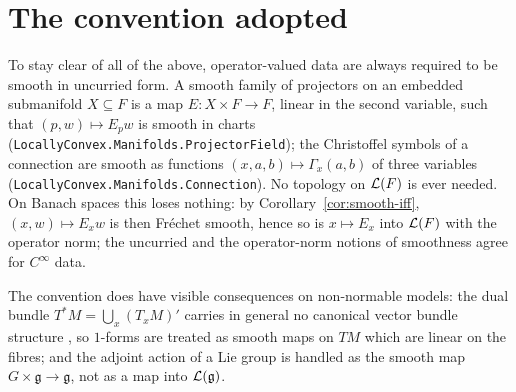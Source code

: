 \section{The convention adopted}

To stay clear of all of the above, operator-valued data are always required to be smooth in
uncurried form. A smooth family of projectors on an embedded submanifold $X \subseteq F$ is a
map $E \colon X \times F \to F$, linear in the second variable, such that $(p, w) \mapsto
E_p w$ is smooth in charts (\texttt{LocallyConvex.Manifolds.ProjectorField}); the Christoffel symbols of a
connection are smooth as functions $(x, a, b) \mapsto \Gamma_x(a, b)$ of three variables
(\texttt{LocallyConvex.Manifolds.Connection}). No topology on $\mathcal{L}(F)$ is ever needed. On Banach spaces
this loses nothing: by Corollary~\ref{cor:smooth-iff}, $(x, w) \mapsto E_x w$ is then Fréchet
smooth, hence so is $x \mapsto E_x$ into $\mathcal{L}(F)$ with the operator norm; the uncurried and
the operator-norm notions of smoothness agree for $C^\infty$ data.

The convention does have visible consequences on non-normable models: the dual bundle
$T^*M = \bigcup_x (T_x M)'$ carries in general no canonical vector bundle structure
\cite[notes to Ch.~3]{GN26}, so $1$-forms are treated as smooth maps on $TM$ which are linear on
the fibres; and the adjoint action of a Lie group is handled as the smooth map
$G \times \mathfrak{g} \to \mathfrak{g}$, not as a map into $\mathcal{L}(\mathfrak{g})$.
